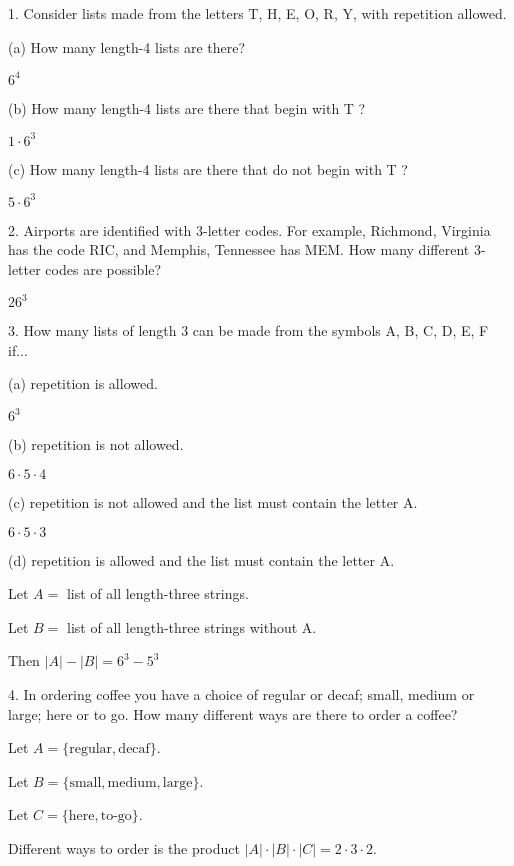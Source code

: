\documentclass{hippoidC}
\begin{document}
\toc

\begin{prooflist} {1.  Consider lists made from the letters T, H, E, O, R, Y,
    with repetition allowed.}
    \item (a) How many length-4 lists are there?
    \item $ 6^4$
    \item (b) How many length-4 lists are there that begin with T ?
    \item $ 1 \cdot 6^3$
    \item (c) How many length-4 lists are there that do not begin with T ?
    \item $ 5 \cdot 6^3$
\end{prooflist}

\begin{prooflist} {2. Airports are identified with 3-letter codes. For example,
    Richmond, Virginia has the code RIC, and Memphis, Tennessee has MEM. How
many different 3-letter codes are possible?}
    \item $ 26^3$
\end{prooflist}

\begin{prooflist} {3. How many lists of length 3 can be made from the symbols A,
    B, C, D, E, F if...}
    \item (a) repetition is allowed.
    \item $ 6^3$
    \item (b) repetition is not allowed.
    \item $ 6\cdot 5 \cdot 4$
    \item (c) repetition is not allowed and the list must contain the letter A.
    \item $ 6\cdot 5 \cdot 3$
    \item (d) repetition is allowed and the list must contain the letter A.
    \item Let $A=$ list of all length-three strings.
    \item Let $B=$ list of all length-three strings without A.
    \item Then $|A| - |B| = 6^3 - 5^3$
\end{prooflist}

\begin{prooflist}{ 4. In ordering coffee you have a choice of regular or decaf;
    small, medium or large; here or to go. How many different ways are there to
order a coffee? }
\item Let $A = \{\text{regular}, \text{decaf}\}$.
\item Let $B = \{\text{small}, \text{medium}, \text{large}\}$.
\item Let $C = \{\text{here}, \text{to-go}\}$.
\item Different ways to order is the product $|A|\cdot|B|\cdot|C| = 2 \cdot 3
    \cdot 2$.
\end{prooflist}
\end{document}
